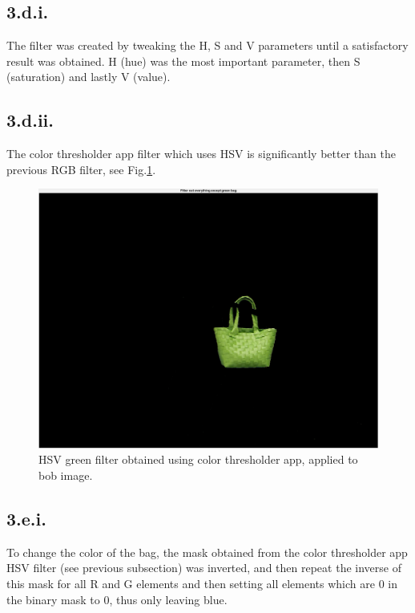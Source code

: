 \subsection{3.d.i.}
The filter was created by tweaking the H, S and V parameters until a satisfactory result was obtained. H (hue) was the most important parameter, then S (saturation) and lastly V (value).

\subsection{3.d.ii.}
The color thresholder app filter which uses HSV is significantly better than the previous RGB filter, see Fig.\:\ref{fig:app_green_bag}.
\begin{figure}
    \centering
    \includegraphics[width=\columnwidth]{images/app_green_bag.png}
    \caption{HSV green filter obtained using color thresholder app, applied to bob image.}
    \label{fig:app_green_bag}
\end{figure}

\subsection{3.e.i.}
To change the color of the bag, the mask obtained from the color thresholder app HSV filter (see previous subsection) was inverted, and then repeat the inverse of this mask for all R and G elements and then setting all elements which are 0 in the binary mask to $0$, thus only leaving blue.

